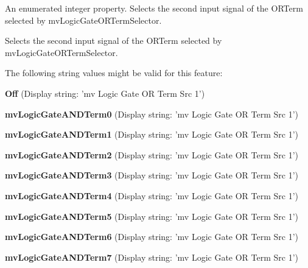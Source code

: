 An enumerated integer property. Selects the second input signal of the O\+R\+Term selected by mv\+Logic\+Gate\+O\+R\+Term\+Selector. 

Selects the second input signal of the O\+R\+Term selected by mv\+Logic\+Gate\+O\+R\+Term\+Selector.

The following string values might be valid for this feature\+:
\begin{DoxyItemize}
\item {\bfseries Off} (Display string\+: 'mv Logic Gate O\+R Term Src 1')
\item {\bfseries mv\+Logic\+Gate\+A\+N\+D\+Term0} (Display string\+: 'mv Logic Gate O\+R Term Src 1')
\item {\bfseries mv\+Logic\+Gate\+A\+N\+D\+Term1} (Display string\+: 'mv Logic Gate O\+R Term Src 1')
\item {\bfseries mv\+Logic\+Gate\+A\+N\+D\+Term2} (Display string\+: 'mv Logic Gate O\+R Term Src 1')
\item {\bfseries mv\+Logic\+Gate\+A\+N\+D\+Term3} (Display string\+: 'mv Logic Gate O\+R Term Src 1')
\item {\bfseries mv\+Logic\+Gate\+A\+N\+D\+Term4} (Display string\+: 'mv Logic Gate O\+R Term Src 1')
\item {\bfseries mv\+Logic\+Gate\+A\+N\+D\+Term5} (Display string\+: 'mv Logic Gate O\+R Term Src 1')
\item {\bfseries mv\+Logic\+Gate\+A\+N\+D\+Term6} (Display string\+: 'mv Logic Gate O\+R Term Src 1')
\item {\bfseries mv\+Logic\+Gate\+A\+N\+D\+Term7} (Display string\+: 'mv Logic Gate O\+R Term Src 1')
\end{DoxyItemize}

